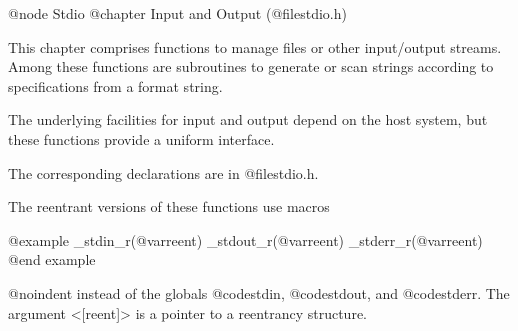@node Stdio
@chapter Input and Output (@file{stdio.h}) 

This chapter comprises functions to manage files
or other input/output streams. Among these functions are subroutines
to generate or scan strings according to specifications from a format string. 

The underlying facilities for input and output depend on the host
system, but these functions provide a uniform interface.

The corresponding declarations are in @file{stdio.h}.

The reentrant versions of these functions use macros

@example
_stdin_r(@var{reent})
_stdout_r(@var{reent})
_stderr_r(@var{reent})
@end example

@noindent
instead of the globals @code{stdin}, @code{stdout}, and
@code{stderr}.  The argument <[reent]> is a pointer to a reentrancy
structure.
 
